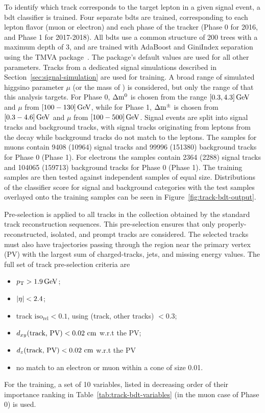 To identify which track corresponds to the target lepton in a given signal event, a \gls{bdt} classifier is trained. Four separate \glspl{bdt} are trained, corresponding to each lepton flavor (muon or electron) and each phase of the tracker (Phase 0 for 2016, and Phase 1 for 2017-2018). All \glspl{bdt} use a common structure of 200 trees with a maximum depth of 3, and are trained with AdaBoost and GiniIndex separation using the TMVA package~\cite{tmva}. The package's default values are used for all other parameters. Tracks from a dedicated \FASTSIM signal simulations described in Section~\ref{sec:signal-simulation} are used for training. A broad range of simulated higgsino parameter $\mu$ (or the mass of \PSGcpmDo) is considered, but only the range of \dm that this analysis targets. For Phase 0, $\Delta\mathrm{m}^0$ is chosen from the range $[0.3,4.3]\,\text{Ge\hspace{-.08em}V}$ and $\mu$ from $[100-130]\,\text{Ge\hspace{-.08em}V}$, while for Phase 1, $\Delta\mathrm{m}^\pm$ is chosen from $[0.3-4.6]\,\text{Ge\hspace{-.08em}V}$ and $\mu$ from $[100-500]\,\text{Ge\hspace{-.08em}V}$. Signal events are split into signal tracks and background tracks, with signal tracks originating from leptons from the decay \neuttdecay while background tracks do not match to the leptons. The samples for muons contain 9408 (10964) signal tracks and 99996 (151380) background tracks for Phase 0 (Phase 1). For electrons the samples contain 2364 (2288) signal tracks and 104065 (159713) background tracks for Phase 0 (Phase 1). The training samples are then tested against independent samples of equal size. Distributions of the classifier score for signal and background categories with the test samples overlayed onto the training samples can be seen in Figure~\ref{fig:track-bdt-output}.

Pre-selection is applied to all tracks in the collection obtained by the standard track reconstruction sequences. This pre-selection ensures that only properly-reconstructed, isolated, and prompt tracks are considered. The selected tracks must also have trajectories passing through the region near the primary vertex (PV) with the largest sum of charged-tracks, jets, and missing energy values. The full set of track pre-selection criteria are
\begin{itemize}
\item $ p_{\mathrm{T}} > 1.9 \,\text{Ge\hspace{-.08em}V}$;
\item $ \lvert \eta \rvert < 2.4$;
\item track $\text{iso}_\text{rel}  < 0.1$, using \DR(track, other tracks) $< 0.3$;
\item $d_{xy}(\text{track, PV}) < 0.02\, \,\text{cm}$ w.r.t the PV;
\item $d_z(\text{track, PV}) < 0.02\, \,\text{cm}$ w.r.t the PV
\item no match to an electron or muon within a cone of size 0.01.
\end{itemize}
For the training, a set of 10 variables, listed in decreasing order of their importance ranking in Table~\ref{tab:track-bdt-variables} (in the muon case of Phase 0) is used.

